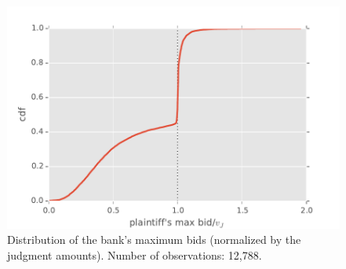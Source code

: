 \documentclass[11pt,twopage]{article}
\begin{document}


\begin{figure}[htbp]
  \centering
  \includegraphics[width=0.6
  \textwidth]{graphics/distr-maxbid}%
  \caption{Distribution of the bank's maximum bids (normalized by the
    judgment amounts). Number of observations: 12,788.}
  \label{fig:public-reserve}
\end{figure}
\end{document}
